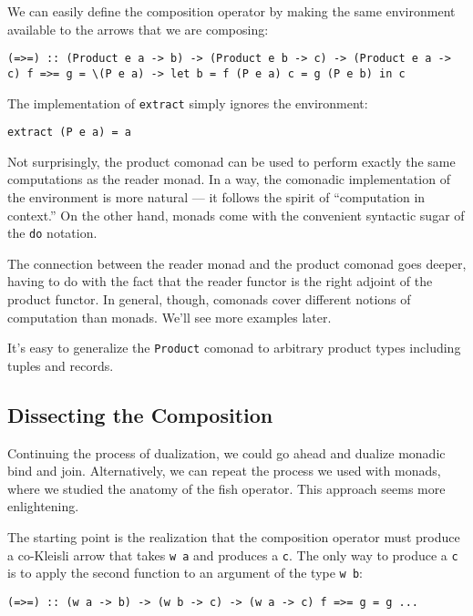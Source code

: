 We can easily define the composition operator by making the same
environment available to the arrows that we are composing:

\begin{verbatim}
(=>=) :: (Product e a -> b) -> (Product e b -> c) -> (Product e a -> c) f =>= g = \(P e a) -> let b = f (P e a) c = g (P e b) in c
\end{verbatim}

The implementation of \texttt{extract} simply ignores the environment:

\begin{verbatim}
extract (P e a) = a
\end{verbatim}

Not surprisingly, the product comonad can be used to perform exactly the
same computations as the reader monad. In a way, the comonadic
implementation of the environment is more natural --- it follows the
spirit of ``computation in context.'' On the other hand, monads come
with the convenient syntactic sugar of the \texttt{do} notation.

The connection between the reader monad and the product comonad goes
deeper, having to do with the fact that the reader functor is the right
adjoint of the product functor. In general, though, comonads cover
different notions of computation than monads. We'll see more examples
later.

It's easy to generalize the \texttt{Product} comonad to arbitrary
product types including tuples and records.

\subsection{Dissecting the
Composition}\label{dissecting-the-composition}

Continuing the process of dualization, we could go ahead and dualize
monadic bind and join. Alternatively, we can repeat the process we used
with monads, where we studied the anatomy of the fish operator. This
approach seems more enlightening.

The starting point is the realization that the composition operator must
produce a co-Kleisli arrow that takes \texttt{w\ a} and produces a
\texttt{c}. The only way to produce a \texttt{c} is to apply the second
function to an argument of the type \texttt{w\ b}:

\begin{verbatim}
(=>=) :: (w a -> b) -> (w b -> c) -> (w a -> c) f =>= g = g ... 
\end{verbatim}


